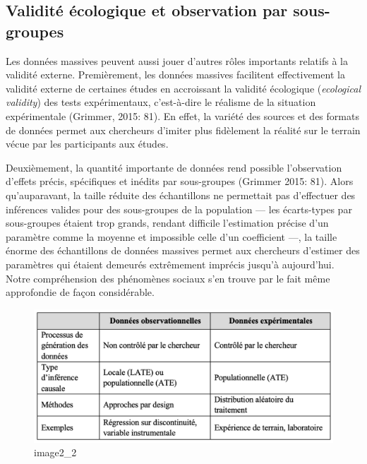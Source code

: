 \documentclass[
  letterpaper,
]{scrbook}
\begin{document}
\hypertarget{validituxe9-uxe9cologique-et-observation-par-sous-groupes}{%
\subsection{Validité écologique et observation par
sous-groupes}\label{validituxe9-uxe9cologique-et-observation-par-sous-groupes}}

Les données massives peuvent aussi jouer d'autres rôles importants
relatifs à la validité externe. Premièrement, les données massives
facilitent effectivement la validité externe de certaines études en
accroissant la validité écologique (\emph{ecological validity}) des
tests expérimentaux, c'est-à-dire le réalisme de la situation
expérimentale (Grimmer, 2015: 81). En effet, la variété des sources et
des formats de données permet aux chercheurs d'imiter plus fidèlement la
réalité sur le terrain vécue par les participants aux études.

Deuxièmement, la quantité importante de données rend possible
l'observation d'effets précis, spécifiques et inédits par sous-groupes
(Grimmer 2015: 81). Alors qu'auparavant, la taille réduite des
échantillons ne permettait pas d'effectuer des inférences valides pour
des sous-groupes de la population --- les écarts-types par sous-groupes
étaient trop grands, rendant difficile l'estimation précise d'un
paramètre comme la moyenne et impossible celle d'un coefficient ---, la
taille énorme des échantillons de données massives permet aux chercheurs
d'estimer des paramètres qui étaient demeurés extrêmement imprécis
jusqu'à aujourd'hui. Notre compréhension des phénomènes sociaux s'en
trouve par le fait même approfondie de façon considérable.

\begin{figure}

{\centering \includegraphics{images/chapitre1_tableau.png}

}

\caption{image2\_2}

\end{figure}
\end{document}
